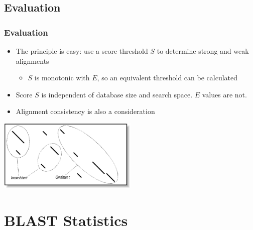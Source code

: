 \documentclass[table]{beamer}
\begin{document}
  \subsection{Evaluation}
  \begin{frame}
    \frametitle{Evaluation}
    \begin{itemize}
      \item The principle is easy: use a score threshold $S$ to determine strong and weak alignments
      \begin{itemize}
        \item $S$ is monotonic with $E$, so an equivalent threshold can be calculated
      \end{itemize}
      \item Score $S$ is independent of database size and search space. $E$ values are not.
      \item Alignment consistency is also a consideration
    \end{itemize}
    \begin{center}
      \includegraphics[width=0.5\textwidth]{images/consistency} 
    \end{center}    
  \end{frame}


  \section{BLAST Statistics}
  
\end{document}
